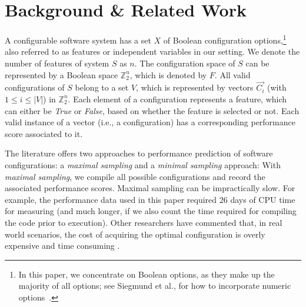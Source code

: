 \documentclass{newsig}
\begin{document}
 
\section{Background \& Related Work}  
\label{sect:addit}

A configurable software system has a set $X$ of Boolean configuration options,\footnote{In this paper, we concentrate on Boolean options, as they make up the majority of all options; see Siegmund et al., for how to incorporate numeric options~\cite{SGA+15}.} also referred to as features or independent variables in our setting.
We denote the number of features of system $S$ as $n$. The configuration space of $S$ can be represented by a Boolean space $\mathbb{Z}_{2}^{n}$, which is denoted by $F$. All valid configurations of $S$ belong to a set $V$, which is represented by vectors $\vec{C_i}$ (with $1\leq i\leq \left\vert{V}\right\vert$) in $\mathbb{Z}_{2}^{n}$. Each element of a configuration represents a feature, which can either be \emph{True} or \emph{False}, based on whether the feature is selected or not. 
Each valid instance of a vector (i.e., a configuration) has a corresponding performance score associated to it. 

The literature offers two approaches to performance prediction of software configurations: a {\em maximal sampling} and a {\em minimal sampling} approach: 
With {\em maximal sampling}, we compile all  possible configurations and record the associated performance scores. 
Maximal sampling  can be impractically slow. For example, the performance data used in this paper required  26 days of CPU time for measuring (and much longer, if we also count the time required for compiling the code prior to execution). 
 Other researchers have commented that,  in 
 real world scenarios, the cost of acquiring the optimal configuration is overly expensive and time consuming \cite{weiss2008maximizing}.
 
\end{document}
